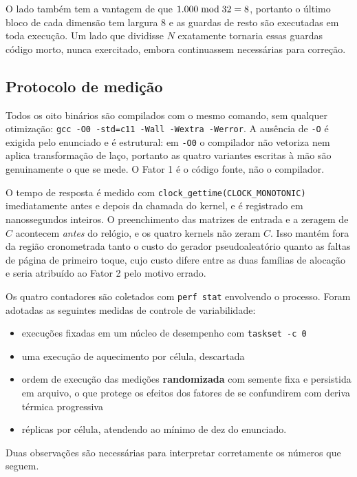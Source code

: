 \documentclass[11pt,a4paper]{article}
\begin{document}
O lado \valBloco{} também tem a vantagem de que $1.000 \bmod 32 = 8$,
portanto o último bloco de cada dimensão tem largura 8 e as guardas de resto são
executadas em toda execução. Um lado que dividisse $N$ exatamente tornaria essas guardas
código morto, nunca exercitado, embora continuassem necessárias para correção.

\subsection{Protocolo de medição}

Todos os oito binários são compilados com o mesmo comando, sem qualquer otimização:
\texttt{gcc -O0 -std=c11 -Wall -Wextra -Werror}. A ausência de \texttt{-O} é exigida pelo
enunciado e é estrutural: em \texttt{-O0} o compilador não vetoriza nem aplica
transformação de laço, portanto as quatro variantes escritas à mão são genuinamente o que
se mede. O Fator 1 é o código fonte, não o compilador.

O tempo de resposta é medido com \texttt{clock\_gettime(CLOCK\_MONOTONIC)} imediatamente
antes e depois da chamada do kernel, e é registrado em nanossegundos inteiros. O
preenchimento das matrizes de entrada e a zeragem de $C$ acontecem \emph{antes} do
relógio, e os quatro kernels não zeram $C$. Isso mantém fora da região cronometrada tanto
o custo do gerador pseudoaleatório quanto as faltas de página de primeiro toque, cujo
custo difere entre as duas famílias de alocação e seria atribuído ao Fator 2 pelo motivo
errado.

Os quatro contadores são coletados com \texttt{perf stat} envolvendo o processo. Foram
adotadas as seguintes medidas de controle de variabilidade:

\begin{itemize}
  \item execuções fixadas em um núcleo de desempenho com \texttt{taskset -c 0}
  \item uma execução de aquecimento por célula, descartada
  \item ordem de execução das \valMedicoes{} medições \textbf{randomizada} com semente
  fixa e persistida em arquivo, o que protege os efeitos dos fatores de se confundirem
  com deriva térmica progressiva
  \item \valReplicas{} réplicas por célula, atendendo ao mínimo de dez do enunciado.
\end{itemize}

Duas observações são necessárias para interpretar corretamente os números que seguem.
\end{document}
